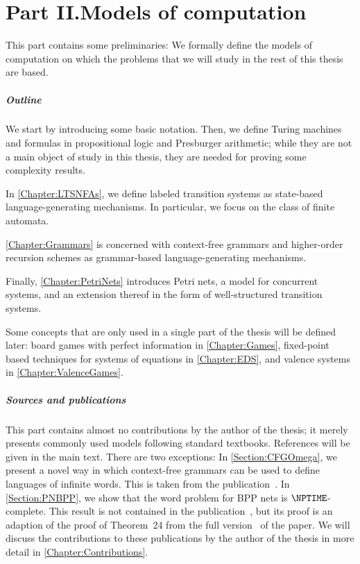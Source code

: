 \documentclass[../../diss.tex]{subfiles}
\begin{document}
\chapter*{Part II.\newline Models of computation}

This part contains some preliminaries:
We formally define the models of computation on which the problems that we will study in the rest of this thesis are based.

\paragraph{Outline}

We start by introducing some basic notation.
Then, we define Turing machines and formulas in propositional logic and Presburger arithmetic; while they are not a main object of study in this thesis, they are needed for proving some complexity results.

In \cref{Chapter:LTSNFAs}, we define labeled transition systems as state-based language-generating mechanisms.
In particular, we focus on the class of finite automata.

\cref{Chapter:Grammars} is concerned with context-free grammars and higher-order recursion schemes as  grammar-based language-generating mechanisms.

Finally, \cref{Chapter:PetriNets} introduces Petri nets, a model for concurrent systems, and an extension thereof in the form of well-structured transition systems.

Some concepts that are only used in a single part of the thesis will be defined later: board games with perfect information in \cref{Chapter:Games}, fixed-point based techniques for systems of equations in \cref{Chapter:EDS}, and valence systems in \cref{Chapter:ValenceGames}.

\paragraph{Sources and publications}

This part contains almost no contributions by the author of the thesis; it merely presents commonly used models following standard textbooks.
References will be given in the main text.
There are two exceptions:
In \cref{Section:CFGOmega}, we present a novel way in which context-free grammars can be used to define languages of infinite words.
This is taken from the publication~\cite{MeyerMN17a}.
In \cref{Section:PNBPP}, we show that the word problem for BPP nets is $\NPTIME$-complete.
This result is not contained in the publication~\cite{AtigMMS17}, but its proof is an adaption of the proof of Theorem~24 from the full version~\cite{AtigMMS17a} of the paper.
We will discuss the contributions to these publications by the author of the thesis in more detail in \cref{Chapter:Contributions}.
\end{document}

